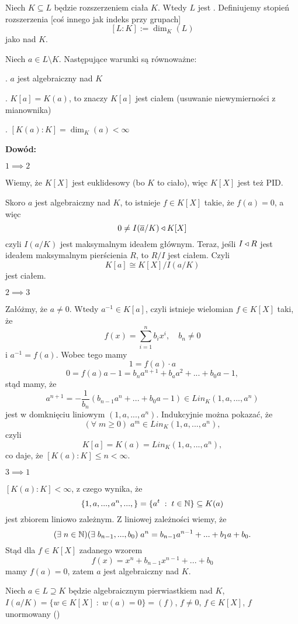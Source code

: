 Niech $K\subseteq L$ będzie rozszerzeniem ciała $K$. Wtedy $L$ jest . Definiujemy stopień rozszerzenia [coś innego jak indeks przy grupach]
$$[L:K]:=\dim_K(L)$$
jako  nad $K$.

\begin{uwaga}
    Niech $a\in L\setminus K$. Następujące warunki są równoważne:

. $a$ jest algebraiczny nad $K$

. $K[a]=K(a)$, to znaczy $K[a]$ jest ciałem (usuwanie niewymierności z mianownika)

. $[K(a):K]=\dim_K(a)<\infty$
\end{uwaga}

\textbf{Dowód:}

$1\implies2$

Wiemy, że $K[X]$ jest euklidesowy (bo $K$ to ciało), więc $K[X]$ jest też PID.

Skoro $a$ jest algebraiczny nad $K$, to istnieje $f\in K[X]$ takie, że $f(a)=0$, a więc
$$0\neq I(\overline a/K)\triangleleft K[X]$$
czyli $I(a/K)$ jest maksymalnym ideałem głównym. Teraz, jeśli $I\triangleleft R$ jest ideałem maksymalnym pierścienia $R$, to $R/I$ jest ciałem. Czyli
$$K[a]\cong K[X]/I(a/K)$$
jest ciałem.

$2\implies 3$

Załóżmy, że $a\neq 0$. Wtedy $a^{-1}\in K[a]$, czyli istnieje wielomian $f\in K[X]$ taki, że 
$$f(x)=\sum\limits_{i=1}^n b_ix^i,\quad b_n\neq 0$$
i $a^{-1}=f(a)$. Wobec tego mamy
$$1=f(a)\cdot a$$
$$0=f(a)a-1=b_na^{n+1}+b_aa^2+...+b_0a-1,$$
stąd mamy, że
$$a^{n+1}=-\frac1{b_n}(b_{n-1}a^n+...+b_0a-1)\in Lin_K(1, a, ..., a^n)$$
jest w domknięciu liniowym $(1, a,..., a^n)$. Indukcyjnie można pokazać, że
$$(\forall\;m\geq0)\;a^m\in Lin_K(1,a,...,a^n),$$
czyli 
$$K[a]=K(a)=Lin_K(1,a,...,a^n),$$ 
co daje, że $[K(a):K]\leq n<\infty$.

$3\implies 1$

$[K(a):K]<\infty$, z czego wynika, że
$$\{1,a,...,a^n,...,\}=\{a^t\;:\;t\in\mathbb{N}\}\subseteq K(a)$$
jest zbiorem liniowo zależnym. Z liniowej zależności wiemy, że
$$(\exists\;n\in\mathbb{N})(\exists\;b_{n-1},...,b_0)\;a^{n}=b_{n-1}a^{n-1}+...+b_1a+b_0.$$
Stąd dla $f\in K[X]$ zadanego wzorem
$$f(x)=x^n+b_{n-1}x^{n-1}+...+b_0$$
mamy $f(a)=0$, zatem $a$ jest algebraiczny nad $K$.
\medskip

Niech $a\in L\supseteq K$ będzie algebraicznym pierwiastkiem nad $K$, $I(a/K)=\{w\in K[X]\;:\;w(a)=0\}=(f)$, $f\neq 0$, $f\in K[X]$, $f$ unormowany ()

